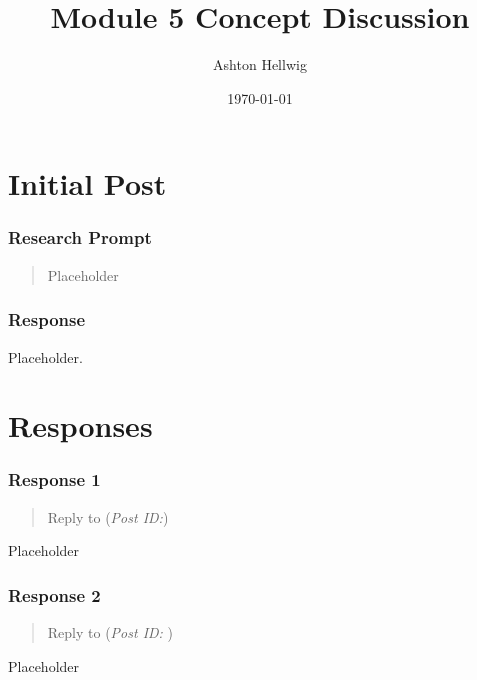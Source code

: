 \documentclass[12pt]{article}
\title{Module 5 Concept Discussion}
\author{Ashton Hellwig}
\date{\today}
\theoremstyle{definition}
\theoremstyle{plain}
\begin{document}
  \maketitle
  \tableofcontents
  \lstlistoflistings
  \newpage


  \part{Initial Post}

    \section{Research Prompt}
      \begin{quote}
        Placeholder
      \end{quote}

    \section{Response}
      Placeholder.


  \newpage
  \part{Responses}

    \section{Response 1}
      \begin{quote}
        Reply to \textbf{} (\textit{Post ID:})
      \end{quote}
      Placeholder

    \section{Response 2}
      \begin{quote}
        Reply to \textbf{} (\textit{Post ID: })
      \end{quote}
      Placeholder

\end{document}
